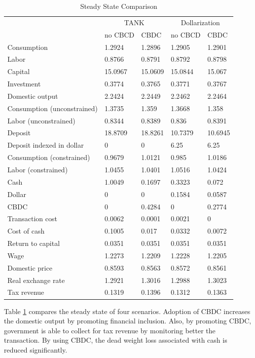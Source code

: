 \documentclass[12pt]{article}
\begin{document}
  
\begin{table}[h!]
\centering
\begin{tabular}{lllll}
\hline\hline
                 &\multicolumn{2}{c}{TANK}  &\multicolumn{2}{c}{Dollarization}  \\
                 &  no CBCD & CBDC & no CBCD &  CBDC  \\\hline
Consumption                 & 1.2924  & 1.2896  & 1.2905  & 1.2901  \\
Labor                       & 0.8766  & 0.8791  & 0.8792  & 0.8798  \\
Capital                     & 15.0967 & 15.0609 & 15.0844 & 15.067  \\
Investment                  & 0.3774  & 0.3765  & 0.3771  & 0.3767  \\
Domestic output             & 2.2424  & 2.2449  & 2.2462  & 2.2464  \\
Consumption (unconstrained) & 1.3735  & 1.359   & 1.3668  & 1.358   \\
Labor (unconstrained)       & 0.8344  & 0.8389  & 0.836   & 0.8391  \\
Deposit                     & 18.8709 & 18.8261 & 10.7379 & 10.6945 \\
Deposit indexed in dollar   & 0       & 0       & 6.25    & 6.25    \\
Consumption (constrained)   & 0.9679  & 1.0121  & 0.985   & 1.0186  \\
Labor (constrained)         & 1.0455  & 1.0401  & 1.0516  & 1.0424  \\
Cash                        & 1.0049  & 0.1697  & 0.3323  & 0.072   \\
Dollar                      & 0       & 0       & 0.1584  & 0.0587  \\
CBDC                  & 0       & 0.4284  & 0       & 0.2774  \\
Transaction cost            & 0.0062  & 0.0001  & 0.0021  & 0       \\
Cost of cash                & 0.1005  & 0.017   & 0.0332  & 0.0072  \\
Return to capital           & 0.0351  & 0.0351  & 0.0351  & 0.0351  \\
Wage                        & 1.2273  & 1.2209  & 1.2228  & 1.2205  \\
Domestic price              & 0.8593  & 0.8563  & 0.8572  & 0.8561  \\
Real exchange rate          & 1.2921  & 1.3016  & 1.2988  & 1.3023  \\
Tax revenue                 & 0.1319  & 0.1396  & 0.1312  & 0.1363 \\\hline
\end{tabular}
\caption{Steady State Comparison}
\label{SS}
\end{table}
Table \ref{SS} compares the steady state of four scenarios. Adoption of CBDC increases the domestic output by promoting financial inclusion. Also, by promoting CBDC, government is able to collect for tax revenue by monitoring better the transaction. By using CBDC, the dead weight loss associated with cash is reduced significantly. 
      
\end{document}
